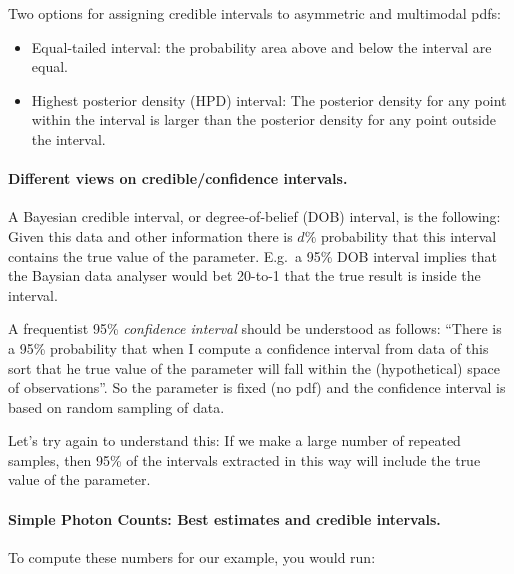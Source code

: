 \documentclass[%
oneside,                 %
final,                   %
10pt]{article}
\newenvironment{block_mdfboxadmon}[1][]{
\begin{block_mdfboxmdframed}[frametitle=#1]
}
{
\end{block_mdfboxmdframed}
}
\begin{document}
\begin{block_mdfboxadmon}[]
Two options for assigning credible intervals to asymmetric and multimodal pdfs:
\begin{itemize}
\item Equal-tailed interval: the probability area above and below the interval are equal.

\item Highest posterior density (HPD) interval: The posterior density for any point within the interval is larger than the posterior density for any point outside the interval.
\end{itemize}

\noindent
\end{block_mdfboxadmon} %




\paragraph{Different views on credible/confidence intervals.}

\begin{block_mdfboxadmon}[]
A Bayesian credible interval, or degree-of-belief (DOB) interval, is the following: Given this data and other information there is $d \%$ probability that this interval contains the true value of the parameter. E.g.~a 95\% DOB interval implies that the Baysian data analyser would bet 20-to-1 that the true result is inside the interval.
\end{block_mdfboxadmon} %




\begin{block_mdfboxadmon}[]
A frequentist 95\% \emph{confidence interval} should be understood as follows: 
``There is a 95\% probability that when I compute a confidence interval from data of this sort that he true value of the parameter will fall within the (hypothetical) space of observations''. So the parameter is fixed (no pdf) and the confidence interval is based on random sampling of data. 

Let's try again to understand this: If we make a large number of repeated samples, then 95\% of the intervals extracted in this way will include the true value of the parameter.
\end{block_mdfboxadmon} %




\paragraph{Simple Photon Counts: Best estimates and credible intervals.}
To compute these numbers for our example, you would run:
\end{document}
